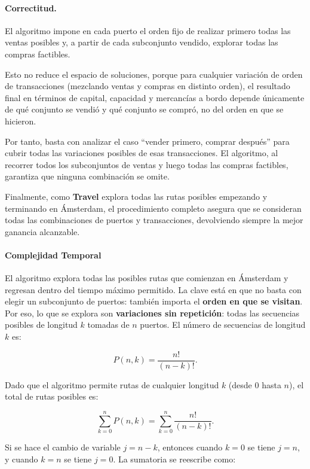 \documentclass[12pt, a4paper]{article}
\begin{document}
\paragraph{Correctitud.}
El algoritmo impone en cada puerto el orden fijo de realizar primero todas las ventas posibles y, a partir de cada subconjunto vendido, explorar todas las compras factibles. 

Esto no reduce el espacio de soluciones, porque para cualquier variación de orden de transacciones (mezclando ventas y compras en distinto orden), el resultado final en términos de capital, capacidad y mercancías a bordo depende únicamente de qué conjunto se vendió y qué conjunto se compró, no del orden en que se hicieron. 

Por tanto, basta con analizar el caso “vender primero, comprar después” para cubrir todas las variaciones posibles de esas transacciones. El algoritmo, al recorrer todos los subconjuntos de ventas y luego todas las compras factibles, garantiza que ninguna combinación se omite.

Finalmente, como \textbf{Travel} explora todas las rutas posibles empezando y terminando en Ámsterdam, el procedimiento completo asegura que se consideran todas las combinaciones de puertos y transacciones, devolviendo siempre la mejor ganancia alcanzable.



\paragraph{Complejidad Temporal}
El algoritmo explora todas las posibles rutas que comienzan en Ámsterdam y regresan dentro del tiempo máximo permitido. La clave está en que no basta con elegir un subconjunto de puertos: también importa el \textbf{orden en que se visitan}. Por eso, lo que se explora son 
\textbf{variaciones sin repetición}: todas las secuencias posibles de longitud $k$ tomadas de $n$ puertos. El número de secuencias de longitud $k$ es:


\[
P(n,k) = \frac{n!}{(n-k)!}.
\]



Dado que el algoritmo permite rutas de cualquier longitud $k$ (desde $0$ hasta $n$), el total de rutas posibles es:


\[
\sum_{k=0}^{n} P(n,k) = \sum_{k=0}^{n} \frac{n!}{(n-k)!}.
\]


Si se hace el cambio de variable $j = n-k$, entonces cuando $k=0$ se tiene $j=n$, y cuando $k=n$ se tiene $j=0$. La sumatoria se reescribe como:
\end{document}
